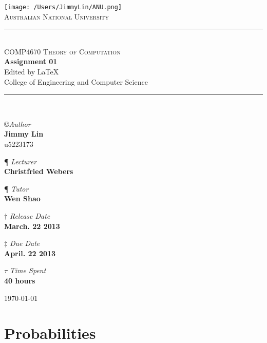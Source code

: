 \documentclass[11pt,a4paper]{article}
\newcommand{\AUTHOR}{Jimmy Lin}
\newcommand{\UID}{u5223173}
\newcommand{\UNIVERSITY}{Australian National University}
\newcommand{\COLLEGE}{College of Engineering and Computer Science}
\newcommand{\COURSE}{COMP4670 Theory of Computation}
\newcommand{\LECTURER}{Christfried Webers}
\newcommand{\TUTOR}{Wen Shao}
\newcommand{\TASK}{Assignment 01}
\newcommand{\RELEASEDATE}{March. 22 2013}
\newcommand{\DUEDATE}{April. 22 2013}
\newcommand{\TIMECONSUME}{40 hours}
\begin{document}
\begin{titlepage}
    \begin{center}
        \vspace*{0.5cm}
\texttt{[image: /Users/JimmyLin/ANU.png]}\\[1cm]
\textsc{\LARGE \UNIVERSITY}\\[1.2cm]

\rule{\linewidth}{0.5mm} \\[0.4cm]
{ \textsc{\Large \COURSE}\\[0.5cm]
 \huge \bfseries \TASK}\\[0.4cm]
 \footnotesize Edited by \LaTeX \\[0.25cm]
 \normalsize{\COLLEGE}
\rule{\linewidth}{0.5mm} \\[2cm]

\begin{center}
\copyright \emph{\large Author} \\
\Large \textbf{\AUTHOR} \\ \UID \vspace*{0.6cm}

\P \emph{ Lecturer} \\
\Large \textbf{\LECTURER} \vspace*{0.6cm}

\P \emph{ Tutor} \\
\Large \textbf{\TUTOR} \vspace*{0.6cm}

$\dagger$ \emph{Release Date}  \\
\Large \textbf{\RELEASEDATE} \vspace*{0.6cm} 

$\ddagger$ \emph{Due Date}  \\
\Large \textbf{\DUEDATE} \vspace*{0.6cm}

$\tau$ \emph{Time Spent} \\
\Large \textbf{\TIMECONSUME} \vspace*{0.6cm} 
\end{center}
\vfill
{\large \today}
\end{center}
\end{titlepage}

\begin{center} \tableofcontents \end{center}
 \newpage
\section{Probabilities}
\end{document}
